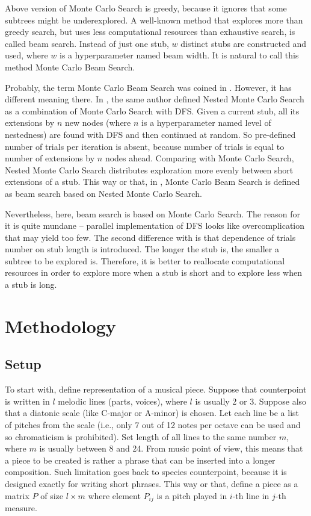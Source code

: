 \documentclass{article}
\begin{document}
Above version of Monte Carlo Search is greedy, because it ignores that some subtrees might be underexplored. A well-known method that explores more than greedy search, but uses less computational resources than exhaustive search, is called beam search. Instead of just one stub, $w$ distinct stubs are constructed and used, where $w$ is a hyperparameter named beam width. It is natural to call this method Monte Carlo Beam Search.

Probably, the term Monte Carlo Beam Search was coined in \cite{cazenave2012beam}. However, it has different meaning there. In \cite{cazenave2009nested}, the same author defined Nested Monte Carlo Search as a combination of Monte Carlo Search with DFS. Given a current stub, all its extensions by $n$ new nodes (where $n$ is a hyperparameter named level of nestedness) are found with DFS and then continued at random. So pre-defined number of trials per iteration is absent, because number of trials is equal to number of extensions by $n$ nodes ahead. Comparing with Monte Carlo Search, Nested Monte Carlo Search distributes exploration more evenly between short extensions of a stub. This way or that, in \cite{cazenave2012beam}, Monte Carlo Beam Search is defined as beam search based on Nested Monte Carlo Search.

Nevertheless, here, beam search is based on Monte Carlo Search. The reason for it is quite mundane -- parallel implementation of DFS looks like overcomplication that may yield too few. The second difference with \cite{cazenave2012beam} is that dependence of trials number on stub length is introduced. The longer the stub is, the smaller a subtree to be explored is. Therefore, it is better to reallocate computational resources in order to explore more when a stub is short and to explore less when a stub is long.

\section{Methodology}
\label{sec:methodology}

\subsection{Setup}
\label{subsec:setup}

To start with, define representation of a musical piece. Suppose that counterpoint is written in $l$ melodic lines (parts, voices), where $l$ is usually 2 or 3. Suppose also that a diatonic scale (like C-major or A-minor) is chosen. Let each line be a list of pitches from the scale (i.e., only 7 out of 12 notes per octave can be used and so chromaticism is prohibited). Set length of all lines to the same number $m$, where $m$ is usually between 8 and 24. From music point of view, this means that a piece to be created is rather a phrase that can be inserted into a longer composition. Such limitation goes back to species counterpoint, because it is designed exactly for writing short phrases. This way or that, define a piece as a matrix $P$ of size $l \times m$ where element $P_{ij}$ is a pitch played in $i$-th line in $j$-th measure.
\end{document}
